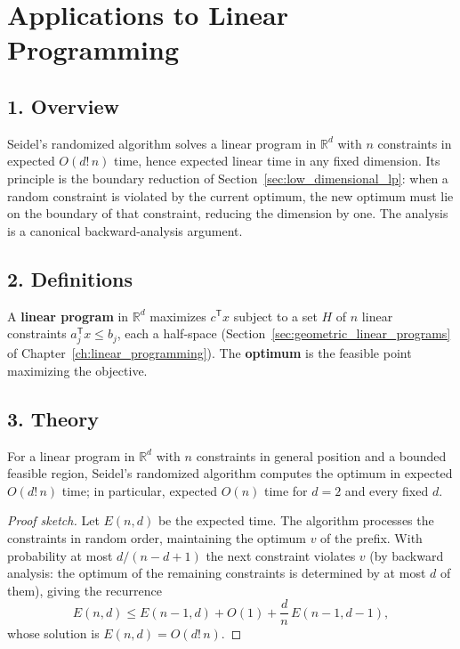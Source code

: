 \section{Applications to Linear Programming}
\label{sec:randomized_linear_programming}

\subsection{1. Overview}

Seidel's randomized algorithm \cite{seidel1990} solves a linear program in
$\mathbb{R}^d$ with $n$ constraints in expected $O(d!\,n)$ time, hence expected
linear time in any fixed dimension. Its principle is the boundary reduction of
Section~\ref{sec:low_dimensional_lp}: when a random constraint is violated by
the current optimum, the new optimum must lie on the boundary of that
constraint, reducing the dimension by one. The analysis is a canonical
backward-analysis argument.

\subsection{2. Definitions}

\begin{definition}\label{def:rand_lp}
  A \textbf{linear program} in $\mathbb{R}^d$ maximizes $c^{\mathsf T} x$
  subject to a set $H$ of $n$ linear constraints $a_j^{\mathsf T} x \le b_j$,
  each a half-space (Section~\ref{sec:geometric_linear_programs} of
  Chapter~\ref{ch:linear_programming}). The \textbf{optimum} is the feasible
  point maximizing the objective.
\end{definition}

\subsection{3. Theory}

\begin{theorem}\label{thm:rand_lp_expected}
  For a linear program in $\mathbb{R}^d$ with $n$ constraints in general
  position and a bounded feasible region, Seidel's randomized algorithm
  computes the optimum in expected $O(d!\,n)$ time; in particular, expected
  $O(n)$ time for $d = 2$ and every fixed $d$.
\end{theorem}

\begin{proof}[Proof sketch]
  Let $E(n,d)$ be the expected time. The algorithm processes the constraints in
  random order, maintaining the optimum $v$ of the prefix. With probability at
  most $d/(n-d+1)$ the next constraint violates $v$ (by backward analysis: the
  optimum of the remaining constraints is determined by at most $d$ of them),
  giving the recurrence
  \[
    E(n,d) \le E(n-1,d) + O(1) + \frac{d}{n}\,E(n-1,d-1),
  \]
  whose solution is $E(n,d) = O(d!\,n)$.
\end{proof}

